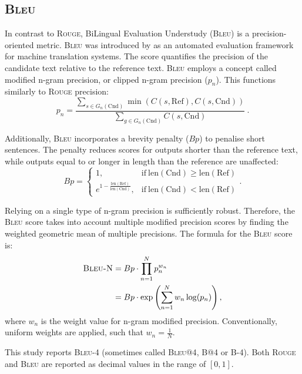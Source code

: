 \documentclass{l4proj}
\begin{document}
\subsection{\textsc{Bleu}}
In contrast to \textsc{Rouge}, BiLingual Evaluation Understudy (\textsc{Bleu}) is a precision-oriented metric. \textsc{Bleu} was introduced by \cite{papineni2002} as an automated evaluation framework for machine translation systems. The score quantifies the precision of the candidate text relative to the reference text.
\textsc{Bleu} employs a concept called modified n-gram precision, or clipped n-gram precision ($p_n$). This functions similarly to \textsc{Rouge} precision:
\begin{equation}
    p_n = \frac{\sum\limits_{s \in G_n(\text{Cnd})}\min\left( C(s, \text{Ref}), C(s, \text{Cnd})\right)}{\sum\limits_{g \in G_n(\text{Cnd})}C(s, \text{Cnd})}\ .
\end{equation}

Additionally, \textsc{Bleu} incorporates a brevity penalty ($Bp$) to penalise short sentences. The penalty reduces scores for outputs shorter than the reference text, while outputs equal to or longer in length than the reference are unaffected:
\begin{equation}
    Bp = 
    \begin{cases}
        1, & \text{if}\ \text{len}(\text{Cnd}) \geq \text{len}(\text{Ref}) \\
        e^{1-\frac{\text{len}(\text{Ref})}{\text{len}(\text{Cnd})}}, & \text{if}\ \text{len}(\text{Cnd}) < \text{len}(\text{Ref})
    \end{cases}
    .
\end{equation}

Relying on a single type of n-gram precision is sufficiently robust. Therefore, the \textsc{Bleu} score takes into account multiple modified precision scores by finding the weighted geometric mean of multiple precisions. The formula for the \textsc{Bleu} score is:
\begin{equation}
\begin{split}
    \textsc{Bleu-N} &= Bp \cdot \prod_{n=1}^N p_n^{w_n} \\
                    &= Bp \cdot \exp\left(\sum_{n=1}^N w_n\log(p_n)\right),
\end{split}
\end{equation}
where $w_n$ is the weight value for n-gram modified precision. Conventionally, uniform weights are applied, such that $w_n = \frac{1}{N}$.

This study reports \textsc{Bleu-4} (sometimes called \textsc{Bleu@4}, \textsc{B@4} or \textsc{B-4}). Both \textsc{Rouge} and \textsc{Bleu} are reported as decimal values in the range of $[0, 1]$.
\end{document}
